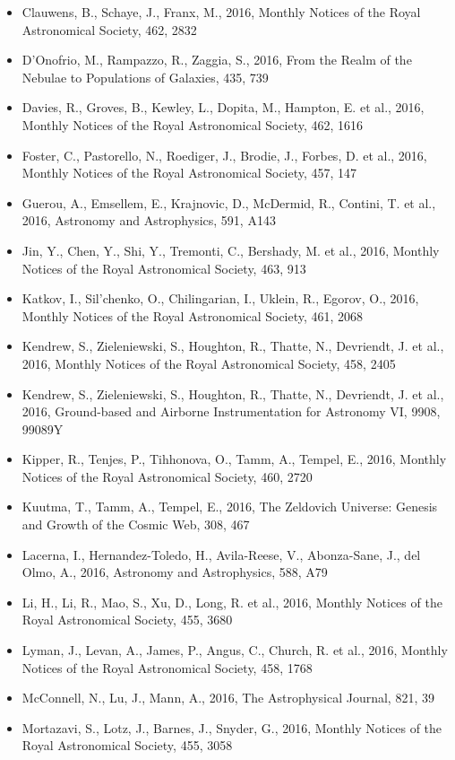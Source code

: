\documentclass{letter}
\begin{document}
\begin{enumerate}
\begin{itemize}
\item Clauwens, B., Schaye, J., Franx, M., 2016, Monthly Notices of the Royal Astronomical Society, 462, 2832
\item D'Onofrio, M., Rampazzo, R., Zaggia, S., 2016, From the Realm of the Nebulae to Populations of Galaxies, 435, 739
\item Davies, R., Groves, B., Kewley, L., Dopita, M., Hampton, E. et al., 2016, Monthly Notices of the Royal Astronomical Society, 462, 1616
\item Foster, C., Pastorello, N., Roediger, J., Brodie, J., Forbes, D. et al., 2016, Monthly Notices of the Royal Astronomical Society, 457, 147
\item Guerou, A., Emsellem, E., Krajnovic, D., McDermid, R., Contini, T. et al., 2016, Astronomy and Astrophysics, 591, A143
\item Jin, Y., Chen, Y., Shi, Y., Tremonti, C., Bershady, M. et al., 2016, Monthly Notices of the Royal Astronomical Society, 463, 913
\item Katkov, I., Sil'chenko, O., Chilingarian, I., Uklein, R., Egorov, O., 2016, Monthly Notices of the Royal Astronomical Society, 461, 2068
\item Kendrew, S., Zieleniewski, S., Houghton, R., Thatte, N., Devriendt, J. et al., 2016, Monthly Notices of the Royal Astronomical Society, 458, 2405
\item Kendrew, S., Zieleniewski, S., Houghton, R., Thatte, N., Devriendt, J. et al., 2016, Ground-based and Airborne Instrumentation for Astronomy VI, 9908, 99089Y
\item Kipper, R., Tenjes, P., Tihhonova, O., Tamm, A., Tempel, E., 2016, Monthly Notices of the Royal Astronomical Society, 460, 2720
\item Kuutma, T., Tamm, A., Tempel, E., 2016, The Zeldovich Universe: Genesis and Growth of the Cosmic Web, 308, 467
\item Lacerna, I., Hernandez-Toledo, H., Avila-Reese, V., Abonza-Sane, J., del Olmo, A., 2016, Astronomy and Astrophysics, 588, A79
\item Li, H., Li, R., Mao, S., Xu, D., Long, R. et al., 2016, Monthly Notices of the Royal Astronomical Society, 455, 3680
\item Lyman, J., Levan, A., James, P., Angus, C., Church, R. et al., 2016, Monthly Notices of the Royal Astronomical Society, 458, 1768
\item McConnell, N., Lu, J., Mann, A., 2016, The Astrophysical Journal, 821, 39
\item Mortazavi, S., Lotz, J., Barnes, J., Snyder, G., 2016, Monthly Notices of the Royal Astronomical Society, 455, 3058

\end{itemize}
\end{enumerate}
\end{document}
